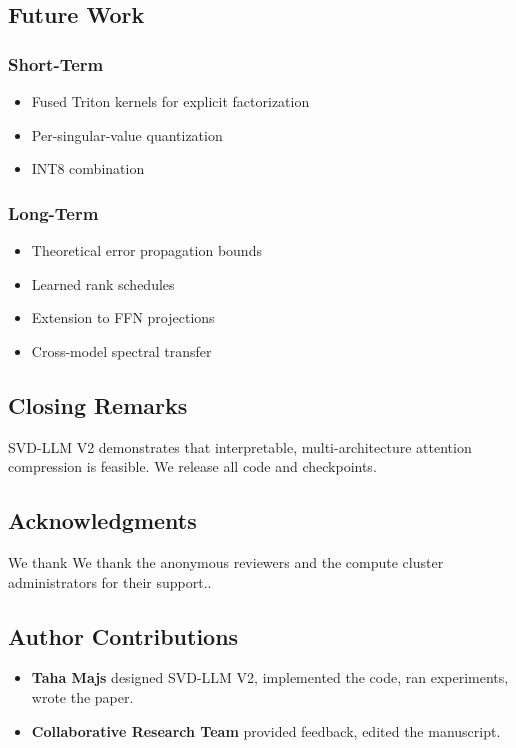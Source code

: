 \subsection{Future Work}

\subsubsection{Short-Term}
\begin{itemize}
\item Fused Triton kernels for explicit factorization
\item Per-singular-value quantization
\item INT8 combination

\end{itemize}
\subsubsection{Long-Term}
\begin{itemize}
\item Theoretical error propagation bounds
\item Learned rank schedules
\item Extension to FFN projections
\item Cross-model spectral transfer

\end{itemize}
\subsection{Closing Remarks}

SVD-LLM V2 demonstrates that interpretable, multi-architecture attention 
compression is feasible. We release all code and checkpoints.

\subsection{Acknowledgments}

We thank We thank the anonymous reviewers and the compute cluster administrators for their support..

\subsection{Author Contributions}

\begin{itemize}
\item \textbf{Taha Majs} designed SVD-LLM V2, implemented the code, ran experiments,
  wrote the paper.
\item \textbf{Collaborative Research Team} provided feedback, edited the manuscript.

\end{itemize}

